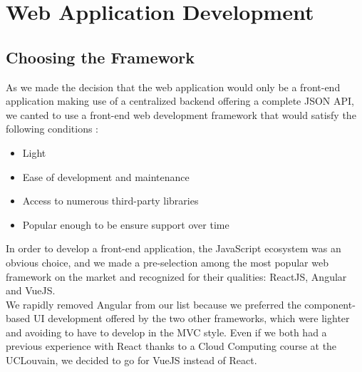 \documentclass{eplmastersthesis}
\begin{document}
    \section{Web Application Development}

      \subsection{Choosing the Framework}

        As we made the decision that the web application would only be a
        front-end application making use of a centralized backend offering
        a complete JSON API, we canted to use a front-end web development
        framework that would satisfy the following conditions : \\

        \begin{itemize}
          \item Light
          \item Ease of development and maintenance
          \item Access to numerous third-party libraries
          \item Popular enough to be ensure support over time
        \end{itemize}

        In order to develop a front-end application, the JavaScript ecosystem
        was an obvious choice, and we made a pre-selection among the most
        popular web framework on the market and recognized for their qualities:
        ReactJS, Angular and VueJS.\\
        We rapidly removed Angular from our list because we preferred the
        component-based UI development offered by the two other frameworks,
        which were lighter and avoiding to have to develop in the MVC style.
        Even if we both had a previous experience with React thanks to a
        Cloud Computing course at the UCLouvain, we decided to go for VueJS
        instead of React.\\
\end{document}
